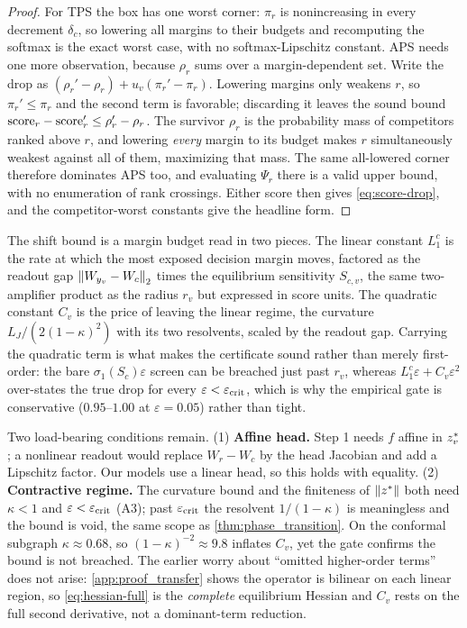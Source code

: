\begin{proof}
For TPS the box has one worst corner: $\pi_r$ is nonincreasing in every decrement $\delta_c$, so lowering
all margins to their budgets and recomputing the softmax is the exact worst case, with no
softmax-Lipschitz constant. APS needs one more observation, because $\rho_r$ sums over a margin-dependent
set. Write the drop as $(\rho_r'-\rho_r)+u_v(\pi_r'-\pi_r)$. Lowering margins only weakens $r$, so
$\pi_r'\le\pi_r$ and the second term is favorable; discarding it leaves the sound bound
$\mathrm{score}_r-\mathrm{score}_r'\le\rho_r'-\rho_r$. The survivor $\rho_r$ is the probability mass of competitors
ranked above $r$, and lowering \emph{every} margin to its budget makes $r$ simultaneously weakest against
all of them, maximizing that mass. The same all-lowered corner therefore dominates APS too, and
evaluating $\Psi_r$ there is a valid upper bound, with no enumeration of rank crossings. Either score
then gives \eqref{eq:score-drop}, and the competitor-worst constants give the headline form.
\end{proof}

The shift bound is a margin budget read in two pieces. The linear constant $L_1^{c}$ is the rate at
which the most exposed decision margin moves, factored as the readout gap $\left\|W_{y_v}-W_c\right\|_2$ times
the equilibrium sensitivity $S_{c,v}$, the same two-amplifier product as the radius $r_v$ but expressed
in score units. The quadratic constant $C_v$ is the price of leaving the linear regime, the curvature
$L_J/(2(1-\kappa)^2)$ with its two resolvents, scaled by the readout gap. Carrying the quadratic term is
what makes the certificate sound rather than merely first-order: the bare $\sigma_1(S_c)\varepsilon$
screen can be breached just past $r_v$, whereas $L_1^{c}\varepsilon+C_v\varepsilon^2$ over-states the
true drop for every $\varepsilon<\varepsilon_{\mathrm{crit}}$, which is why the empirical gate is conservative ($0.95$--$1.00$
at $\varepsilon=0.05$) rather than tight.

\begin{remark}
\label{rem:conf-caveats}
Two load-bearing conditions remain. (1) \textbf{Affine head.} Step 1 needs $f$ affine in $z^{*}_v$; a
nonlinear readout would replace $W_r-W_c$ by the head Jacobian and add a Lipschitz factor. Our models
use a linear head, so this holds with equality. (2) \textbf{Contractive regime.} The curvature bound and
the finiteness of $\left\|z^{*}\right\|$ both need $\kappa<1$ and $\varepsilon<\varepsilon_{\mathrm{crit}}$ (A3); past $\varepsilon_{\mathrm{crit}}$ the
resolvent $1/(1-\kappa)$ is meaningless and the bound is void, the same scope as
\cref{thm:phase_transition}. On the conformal subgraph $\kappa\approx0.68$, so $(1-\kappa)^{-2}\approx9.8$
inflates $C_v$, yet the gate confirms the bound is not breached. The earlier worry about ``omitted
higher-order terms'' does not arise: \cref{app:proof_transfer} shows the operator is bilinear on each
linear region, so \eqref{eq:hessian-full} is the \emph{complete} equilibrium Hessian and $C_v$ rests on
the full second derivative, not a dominant-term reduction.
\end{remark}

